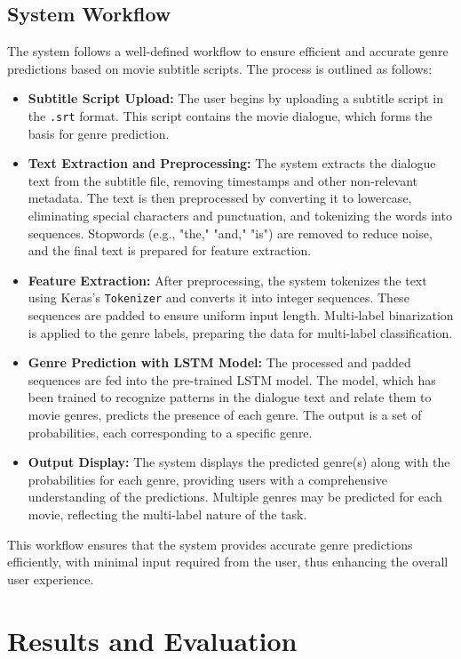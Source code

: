 \documentclass[conference]{IEEEtran}
\begin{document}
\subsection{System Workflow}
The system follows a well-defined workflow to ensure efficient and accurate genre predictions based on movie subtitle scripts. The process is outlined as follows:

\begin{itemize}
    \item \textbf{Subtitle Script Upload:} The user begins by uploading a subtitle script in the \texttt{.srt} format. This script contains the movie dialogue, which forms the basis for genre prediction.
    \item \textbf{Text Extraction and Preprocessing:} The system extracts the dialogue text from the subtitle file, removing timestamps and other non-relevant metadata. The text is then preprocessed by converting it to lowercase, eliminating special characters and punctuation, and tokenizing the words into sequences. Stopwords (e.g., "the," "and," "is") are removed to reduce noise, and the final text is prepared for feature extraction.
    \item \textbf{Feature Extraction:} After preprocessing, the system tokenizes the text using Keras's \texttt{Tokenizer} and converts it into integer sequences. These sequences are padded to ensure uniform input length. Multi-label binarization is applied to the genre labels, preparing the data for multi-label classification.
    \item \textbf{Genre Prediction with LSTM Model:} The processed and padded sequences are fed into the pre-trained LSTM model. The model, which has been trained to recognize patterns in the dialogue text and relate them to movie genres, predicts the presence of each genre. The output is a set of probabilities, each corresponding to a specific genre.
    \item \textbf{Output Display:} The system displays the predicted genre(s) along with the probabilities for each genre, providing users with a comprehensive understanding of the predictions. Multiple genres may be predicted for each movie, reflecting the multi-label nature of the task.
\end{itemize}

This workflow ensures that the system provides accurate genre predictions efficiently, with minimal input required from the user, thus enhancing the overall user experience.
\section{Results and Evaluation}
\end{document}
